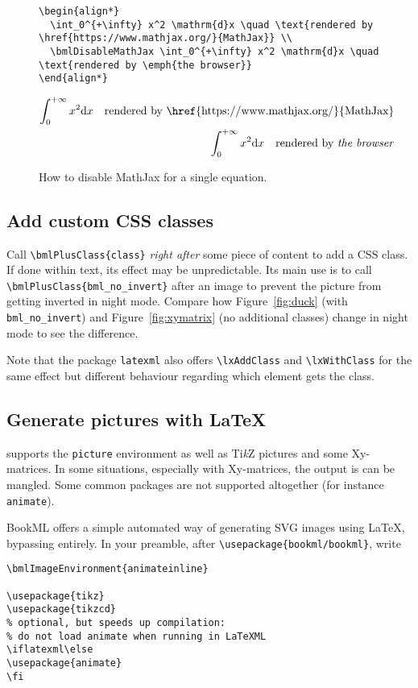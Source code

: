 \documentclass[a4paper,british]{article}
\def\Xy{Xy}
\def\tikzname{Ti\emph{k}Z}
\def\ltxinline{\lstinline[style=bookml]}
\begin{document}
\begin{figure}
  \begin{lstlisting}[style=bookml]
\begin{align*}
  \int_0^{+\infty} x^2 \mathrm{d}x \quad \text{rendered by \href{https://www.mathjax.org/}{MathJax}} \\
  \bmlDisableMathJax \int_0^{+\infty} x^2 \mathrm{d}x \quad \text{rendered by \emph{the browser}}
\end{align*}
  \end{lstlisting}
  \begin{align*}
    \int_0^{+\infty} x^2 \mathrm{d}x \quad \text{rendered by \href{https://www.mathjax.org/}{MathJax}} \\
    \bmlDisableMathJax \int_0^{+\infty} x^2 \mathrm{d}x \quad \text{rendered by \emph{the browser}}
  \end{align*}
  \caption{How to disable MathJax for a single equation.}
  \label{fig:disable-mathjax}
\end{figure}

\subsection{Add custom CSS classes}
Call \ltxinline|\bmlPlusClass{class}| \emph{right after} some piece of content to add a CSS class. If done within text, its effect may be unpredictable. Its main use is to call \ltxinline|\bmlPlusClass{bml_no_invert}| after an image to prevent the picture from getting inverted in night mode. Compare how Figure~\ref{fig:duck} (with \ltxinline|bml_no_invert|) and Figure~\ref{fig:xymatrix} (no additional classes) change in night mode to see the difference.

Note that the package \ltxinline|latexml| also offers \ltxinline|\lxAddClass| and \ltxinline|\lxWithClass| for the same effect but different behaviour regarding which element gets the class.

\subsection{Generate pictures with \LaTeX{}}
\label{sec:external-image}

\LaTeXML{} supports the \ltxinline|picture| environment as well as \tikzname{} pictures and some \Xy-matrices. In some situations, especially with \Xy-matrices, the output is can be mangled. Some common packages are not supported altogether (for instance \ltxinline|animate|).

BookML offers a simple automated way of generating SVG images using \LaTeX{}, bypassing \LaTeXML{} entirely. In your preamble, after \ltxinline|\usepackage{bookml/bookml}|, write
\begin{lstlisting}[style=bookml]
\bmlImageEnvironment{animateinline}

\usepackage{tikz}
\usepackage{tikzcd}
% optional, but speeds up compilation:
% do not load animate when running in LaTeXML
\iflatexml\else
\usepackage{animate}
\fi
\end{lstlisting}
\end{document}
